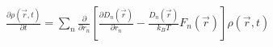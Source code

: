 \documentclass{standalone}
\begin{document}
$\displaystyle
\frac{\partial \rho(\vec r,t)}{\partial t} = \sum_n \frac{\partial}{\partial r_n} \left[ 
    \frac{\partial D_n(\vec r)}{\partial r_n} - \frac{D_n(\vec r)}{k_BT} F_n(\vec r)
\right ]
\rho(\vec r,  t)
$
\end{document}
